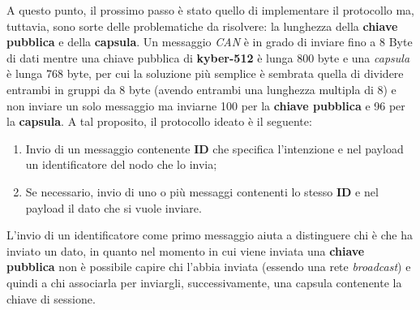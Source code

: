 A questo punto, il prossimo passo è stato quello di implementare il protocollo ma, tuttavia, sono sorte delle problematiche da risolvere: la lunghezza della \textbf{chiave pubblica} e della \textbf{capsula}. Un messaggio \emph{CAN} è in grado di inviare fino a 8 Byte di dati mentre una chiave pubblica di \textbf{kyber-512} è lunga 800 byte e una \emph{capsula} è lunga 768 byte, per cui la soluzione più semplice è sembrata quella di dividere entrambi in gruppi da 8 byte (avendo entrambi una lunghezza multipla di 8) e non inviare un solo messaggio ma inviarne 100 per la \textbf{chiave pubblica} e 96 per la \textbf{capsula}. A tal proposito, il protocollo ideato è il seguente:
\begin{enumerate}
    \item Invio di un messaggio contenente \textbf{ID} che specifica l'intenzione e nel payload un identificatore del nodo che lo invia;
    \item Se necessario, invio di uno o più messaggi contenenti lo stesso \textbf{ID} e nel payload il dato che si vuole inviare.
\end{enumerate}

L'invio di un identificatore come primo messaggio aiuta a distinguere chi è che ha inviato un dato, in quanto nel momento in cui viene inviata una \textbf{chiave pubblica} non è possibile capire chi l'abbia inviata (essendo una rete \emph{broadcast}) e quindi a chi associarla per inviargli, successivamente, una capsula contenente la chiave di sessione.

